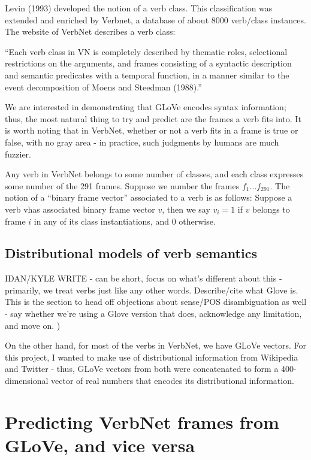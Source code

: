 \documentclass[11pt,a4paper]{article}
\begin{document}
Levin (1993) developed the notion of a verb class. This classification was extended and enriched by Verbnet, a database of about 8000 verb/class instances. The website of VerbNet describes a verb class:

\begin{displayquote}
	“Each verb class in VN is completely described by thematic roles, selectional restrictions on the arguments, and frames consisting of a syntactic description and semantic predicates with a temporal function, in a manner similar to the event decomposition of Moens and Steedman (1988).”
\end{displayquote}

We are interested in demonstrating that GLoVe encodes syntax information; thus, the most natural thing to try and predict are the frames a verb fits into. It is worth noting that in VerbNet, whether or not a verb fits in a frame is true or false, with no gray area - in practice, such judgments by humans are much fuzzier. 


Any verb in VerbNet belongs to some number of classes, and each class expresses some number of the 291 frames. Suppose we number the frames $f_1... f_{291}$. The notion of a “binary frame vector” associated to a verb is as follows: Suppose a verb vhas associated binary frame vector $v$, then we say 
$v_i =1$ if $v$ belongs to frame $i$ in any of its class instantiations, and 0 otherwise.

\subsection{Distributional models of verb semantics}

IDAN/KYLE WRITE - can be short, focus on what's different about this - primarily, we treat verbs just like any other words. Describe/cite what Glove is. This is the section to head off objections about sense/POS disambiguation as well - say whether we're using a Glove version that does, acknowledge any limitation, and move on. )

On the other hand, for most of the verbs in VerbNet, we have GLoVe vectors. For this project, I wanted to make use of distributional information from Wikipedia and Twitter - thus, GLoVe vectors from both were concatenated to form a 400-dimensional vector of real numbers that encodes its distributional information. 

\section{Predicting VerbNet frames from GLoVe, and vice versa}
\end{document}
